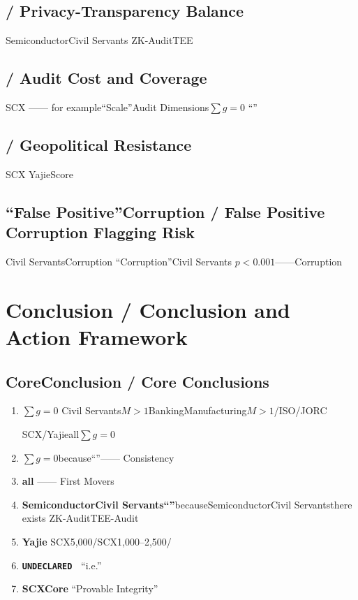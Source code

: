 \documentclass[12pt,a4paper]{article}
\theoremstyle{remark}
\newcommand{\sumgeq}{\sum g = 0}
\newcommand{\undeclared}{\texttt{UNDECLARED}}
\begin{document}
\subsection{ / Privacy-Transparency Balance}

SemiconductorCivil Servants
ZK-AuditTEE


\subsection{ / Audit Cost and Coverage}

SCX\textit{}
——
for example``Scale''Audit Dimensions$\sumgeq$
``''

\subsection{ / Geopolitical Resistance}

SCX
YajieScore

\subsection{``False Positive''Corruption / False Positive Corruption Flagging Risk}

Civil ServantsCorruption
``Corruption''Civil Servants
$p < 0.001$——Corruption

\section{Conclusion / Conclusion and Action Framework}

\subsection{CoreConclusion / Core Conclusions}

\begin{enumerate}[leftmargin=*, label=\textbf{(\arabic*)}]
    \item \textbf{$\sumgeq$}
    Civil Servants$M>1$BankingManufacturing$M>1$/ISO/JORC
    
    SCX/Yajieall$\sumgeq$

    \item \textbf{$\sumgeq$}because``''——
    Consistency
    

    \item \textbf{all}
    ——
    First Movers

    \item \textbf{SemiconductorCivil Servants``''}becauseSemiconductorCivil Servantsthere exists
    ZK-AuditTEE-Audit

    \item \textbf{Yajie}
    SCX5,000/SCX1,000--2,500/

    \item \textbf{\undeclared\ }
    ``i.e.''

    \item \textbf{SCXCore}
    ``Provable Integrity''
\end{enumerate}
\end{document}
